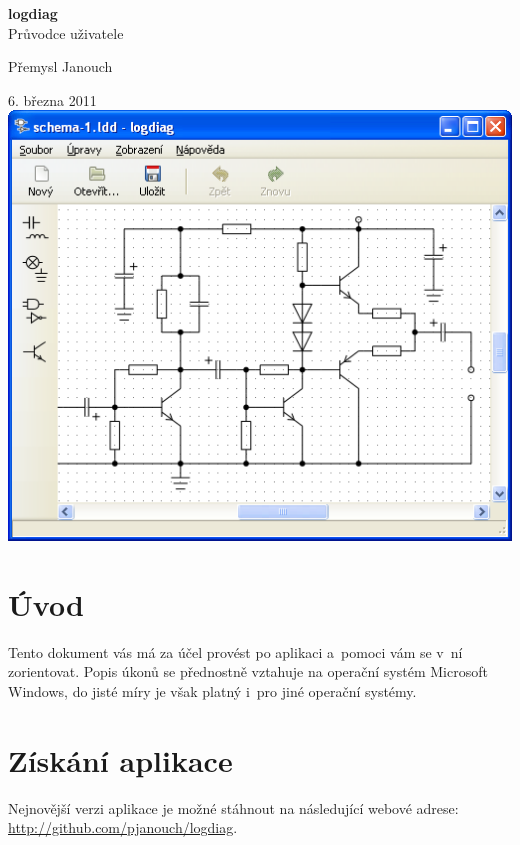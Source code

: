 \documentclass[12pt,oneside,a4paper,titlepage,final]{article}
\theoremstyle{note}
\newcommand{\gettitle}{logdiag}
\newcommand{\getsubtitle}{Průvodce uživatele}
\newcommand{\getauthor}{Přemysl Janouch}
\newcommand{\getdate}{6. března 2011}
\begin{document}
\renewcommand{\thepage}{\roman{page}}

\thispagestyle{empty}

\begin{center}
	\doublespacing
	\textbf{\LARGE\gettitle}\\{\Large\getsubtitle}
	\par\getauthor
	\par\getdate
	\vfill
	\includegraphics{logdiag-cs}
	\newpage
\end{center}

\tableofcontents
\newpage

\renewcommand{\thepage}{\arabic{page}}
\setcounter{page}{1}

\section{Úvod}
Tento dokument vás má za účel provést po aplikaci a~pomoci vám se v~ní zorientovat. Popis úkonů se přednostně vztahuje na operační systém Microsoft Windows, do jisté míry je však platný i~pro jiné operační systémy.

\section{Získání aplikace}
Nejnovější verzi aplikace je možné stáhnout na následující webové adrese: \mbox{\url{http://github.com/pjanouch/logdiag}}.
\end{document}
